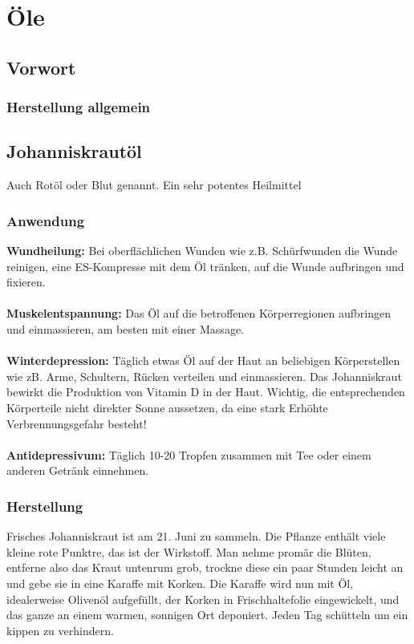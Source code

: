 \chapter{Öle}


\section{Vorwort}

\subsection{Herstellung allgemein}


\section{Johanniskrautöl}

Auch Rotöl oder Blut genannt. Ein sehr potentes Heilmittel

\subsection{Anwendung}

\textbf{Wundheilung:} Bei oberflächlichen Wunden wie z.B. Schürfwunden die Wunde reinigen, eine ES-Kompresse mit dem Öl tränken, auf die Wunde aufbringen und fixieren.\\ \\
\textbf{Muskelentspannung:} Das Öl auf die betroffenen Körperregionen aufbringen und einmassieren, am besten mit einer Massage. \\ \\
\textbf{Winterdepression:} Täglich etwas Öl auf der Haut an beliebigen Körperstellen wie zB. Arme, Schultern, Rücken verteilen und einmassieren. Das Johanniskraut bewirkt die Produktion von Vitamin D in der Haut. Wichtig, die entsprechenden Körperteile nicht direkter Sonne aussetzen, da eine stark Erhöhte Verbrennungsgefahr besteht! \\ \\
\textbf{Antidepressivum:} Täglich 10-20 Tropfen zusammen mit Tee oder einem anderen Getränk einnehmen. 

\subsection{Herstellung}

Frisches Johanniskraut ist am 21. Juni zu sammeln. Die Pflanze enthält viele kleine rote Punktre, das ist der Wirkstoff. Man nehme promär die Blüten, entferne also das Kraut untenrum grob, trockne diese ein paar Stunden leicht an und gebe sie in eine Karaffe mit Korken. Die Karaffe wird nun mit Öl, idealerweise Olivenöl aufgefüllt, der Korken in Frischhaltefolie eingewickelt, und das ganze an einem warmen, sonnigen Ort deponiert. Jeden Tag schütteln um ein kippen zu verhindern.

